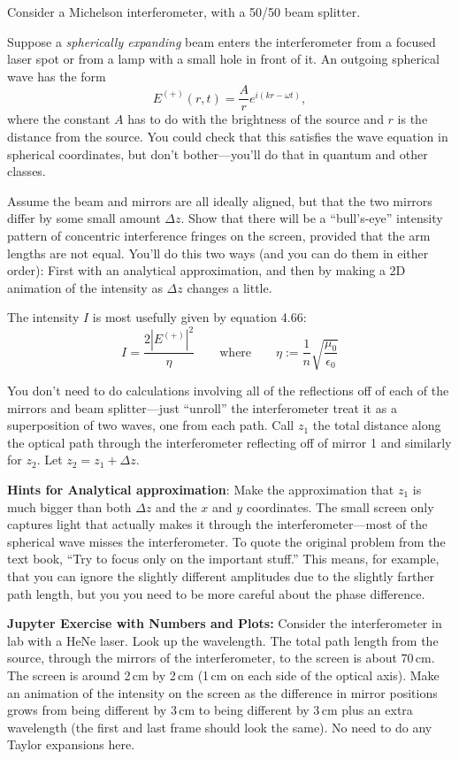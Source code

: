 \documentclass[11pt]{hmcpset}
\begin{document}
\begin{problem}
	Consider a Michelson interferometer, with a 50/50 beam splitter.
	
	Suppose a \textit{spherically expanding} beam enters the interferometer from a focused laser spot or from a lamp with a small hole in front of it. An outgoing spherical wave has the form
	\[
	E^{(+)}(r,t) = \frac{A}{r}e^{i(kr-\omega t)},
	\]
	where the constant $A$ has to do with the brightness of the source and $r$ is the distance from the source. You could check that this satisfies the wave equation in spherical coordinates, but don't bother---you'll do that in quantum and other classes.
	
	Assume the beam and mirrors are all ideally aligned, but that the two mirrors differ by some small amount $\Delta z$. Show that there will be a ``bull's-eye'' intensity pattern of concentric interference fringes on the screen,	provided that the arm lengths are not equal. You'll do this two ways (and you can do them in either order): First with an analytical approximation, and then by making a 2D animation of the intensity as $\Delta z$ changes a little.
	
	The intensity $I$ is most usefully given by equation 4.66:
	\[
	I = \frac{2|E^{(+)}|^2}{\eta}
	\qquad \textrm{where} \qquad
	 \eta := \frac{1}{n}\sqrt{\frac{\mu_0}{\epsilon_0}}
	\]
	
	You don't need to do calculations involving all of the reflections off of each of the mirrors and beam splitter---just ``unroll'' the interferometer treat it as a superposition of two waves, one from each path. Call $z_1$ the total distance along the optical path through the interferometer reflecting off of mirror 1 and similarly for $z_2$. Let $z_2 = z_1 + \Delta z$.
	
	\textbf{Hints for Analytical approximation}:  Make the approximation that $z_1$ is much bigger than both $\Delta z$ and the $x$ and $y$ coordinates. The small screen only captures light that actually makes it through the interferometer---most of the spherical wave misses the interferometer. To quote the original problem from the text book, ``Try to focus only on the important stuff.'' This means, for example, that you can ignore the slightly different amplitudes due to the slightly farther path length, but you you need to be more careful about the phase difference.
	
	\textbf{Jupyter Exercise with Numbers and Plots:} Consider the interferometer in lab with a HeNe laser. Look up the wavelength. The total path length from the source, through the mirrors of the interferometer, to the screen is about 70\,cm. The screen is around 2\,cm by 2\,cm (1\,cm on each side of the optical axis).  Make an animation of the intensity on the screen as the difference in mirror positions grows from being different by 3\,cm to being different by 3\,cm plus an extra wavelength (the first and last frame should look the same). No need to do any Taylor expansions here.
\end{problem}
\end{document}
